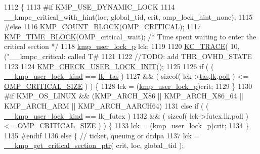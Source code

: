 \begin{DoxyCode}
1112 \{
1113 \textcolor{preprocessor}{#if KMP\_USE\_DYNAMIC\_LOCK}
1114 \textcolor{preprocessor}{}    \_\_kmpc\_critical\_with\_hint(loc, global\_tid, crit, omp\_lock\_hint\_none);
1115 \textcolor{preprocessor}{#else}
1116 \textcolor{preprocessor}{}    \hyperlink{group__STATS__GATHERING_ga7fa64ec62947bf0b97f3f4778dd22196}{KMP\_COUNT\_BLOCK}(OMP\_CRITICAL);
1117     \hyperlink{group__STATS__GATHERING_ga62f4b6e3a4ba48c04b172b97df137839}{KMP\_TIME\_BLOCK}(OMP\_critical\_wait);        \textcolor{comment}{/* Time spent waiting to enter the critical
       section */}
1118     \hyperlink{unionkmp__user__lock}{kmp\_user\_lock\_p} lck;
1119 
1120     \hyperlink{kmp__debug_8h_ab49eefbf8c74cfe98a90ce7ec8864add}{KC\_TRACE}( 10, (\textcolor{stringliteral}{"\_\_kmpc\_critical: called T#%
1121 
1122     \textcolor{comment}{//TODO: add THR\_OVHD\_STATE}
1123 
1124     \hyperlink{kmp__lock_8h_a1fe7b593db0b08058d9faa009deb6467}{KMP\_CHECK\_USER\_LOCK\_INIT}();
1125 
1126     \textcolor{keywordflow}{if} ( ( \hyperlink{kmp__lock_8cpp_a0e6c33ed4cfc6430f93288ca2c2bfebe}{\_\_kmp\_user\_lock\_kind} == \hyperlink{kmp__lock_8h_a8311c5b02d0737c62b10926473f6c51eae38ddd756bdb44cee826f0c40f1b32ba}{lk\_tas} )
1127       && ( \textcolor{keyword}{sizeof}( lck->\hyperlink{unionkmp__user__lock_ac0b526819ee392b205697ed5786ccf3f}{tas}.\hyperlink{unionkmp__tas__lock_ad51358485337a210e18f4ea9cbe6477a}{lk}.\hyperlink{structkmp__base__tas__lock_a32c35f002d15ce50345770498ab6b0c0}{poll} ) <= \hyperlink{kmp__lock_8h_ae4248e556b3988e66a875212cf902da6}{OMP\_CRITICAL\_SIZE} ) ) \{
1128         lck = (\hyperlink{kmp__lock_8h_a35c88b3ea74b2a8d633ec8156c1c4670}{kmp\_user\_lock\_p})crit;
1129     \}
1130 \textcolor{preprocessor}{#if KMP\_OS\_LINUX && (KMP\_ARCH\_X86 || KMP\_ARCH\_X86\_64 || KMP\_ARCH\_ARM || KMP\_ARCH\_AARCH64)}
1131 \textcolor{preprocessor}{}    \textcolor{keywordflow}{else} \textcolor{keywordflow}{if} ( ( \hyperlink{kmp__lock_8cpp_a0e6c33ed4cfc6430f93288ca2c2bfebe}{\_\_kmp\_user\_lock\_kind} == lk\_futex )
1132       && ( \textcolor{keyword}{sizeof}( lck->futex.lk.poll ) <= \hyperlink{kmp__lock_8h_ae4248e556b3988e66a875212cf902da6}{OMP\_CRITICAL\_SIZE} ) ) \{
1133         lck = (\hyperlink{kmp__lock_8h_a35c88b3ea74b2a8d633ec8156c1c4670}{kmp\_user\_lock\_p})crit;
1134     \}
1135 \textcolor{preprocessor}{#endif}
1136 \textcolor{preprocessor}{}    \textcolor{keywordflow}{else} \{ \textcolor{comment}{// ticket, queuing or drdpa}
1137         lck = \hyperlink{kmp__csupport_8c_a0c2f457d045ac42586443ccf8dd48e54}{\_\_kmp\_get\_critical\_section\_ptr}( crit, loc, global\_tid );
}
\end{DoxyCode}
